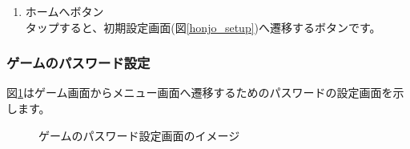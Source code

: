 \documentclass[a4j]{jarticle}
\begin{document}
\begin{enumerate}
  \renewcommand{\labelenumi}{\textcircled{\scriptsize \theenumi}}
\item ホームへボタン\\
  タップすると、初期設定画面(図\ref{honjo_setup})へ遷移するボタンです。
\end{enumerate}

\newpage
\subsubsection{ゲームのパスワード設定}
図\ref{passwordchange}はゲーム画面からメニュー画面へ遷移するためのパスワードの設定画面を示します。\\

\begin{figure}[H]
    \begin{center}
    \caption {ゲームのパスワード設定画面のイメージ}
    \label{passwordchange}
    \end{center}
\end{figure}
\end{document}
